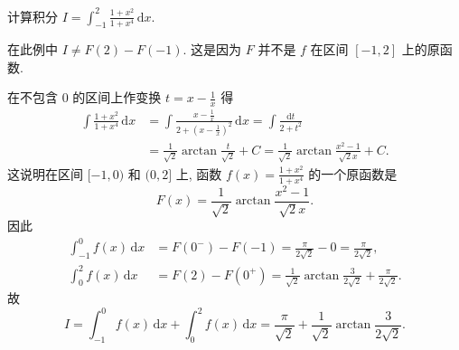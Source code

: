 \documentclass[../../main.tex]{subfiles}
\begin{document}
\begin{example}
计算积分 $I=\int_{-1}^{2}\frac{1+x^{2}}{1+x^{4}}\,\mathrm{d}x$.
\end{example}
\begin{remark}
在此例中 $I\neq F(2)-F(-1)$. 这是因为 $F$ 并不是 $f$ 在区间 $[-1,2]$ 上的原函数.
\end{remark}
\begin{solution}
在不包含 $0$ 的区间上作变换 $t=x-\frac{1}{x}$ 得
\begin{align*}
\int\frac{1+x^{2}}{1+x^{4}}\,\mathrm{d}x&=\int\frac{x-\frac{1}{x}}{2+\left(x-\frac{1}{x}\right)^{2}}\,\mathrm{d}x=\int\frac{\mathrm{d}t}{2+t^{2}}\\
&=\frac{1}{\sqrt{2}}\arctan\frac{t}{\sqrt{2}}+C=\frac{1}{\sqrt{2}}\arctan\frac{x^{2}-1}{\sqrt{2}x}+C.
\end{align*}
这说明在区间 $[-1,0)$ 和 $(0,2]$ 上, 函数 $f(x)=\frac{1+x^{2}}{1+x^{4}}$ 的一个原函数是
$$F(x)=\frac{1}{\sqrt{2}}\arctan\frac{x^{2}-1}{\sqrt{2}x}.$$
因此
\begin{align*}
\int_{-1}^{0}f(x)\,\mathrm{d}x&=F(0^{-})-F(-1)=\frac{\pi}{2\sqrt{2}}-0=\frac{\pi}{2\sqrt{2}},\\
\int_{0}^{2}f(x)\,\mathrm{d}x&=F(2)-F(0^{+})=\frac{1}{\sqrt{2}}\arctan\frac{3}{2\sqrt{2}}+\frac{\pi}{2\sqrt{2}}.
\end{align*}
故
$$I=\int_{-1}^{0}f(x)\,\mathrm{d}x+\int_{0}^{2}f(x)\,\mathrm{d}x=\frac{\pi}{\sqrt{2}}+\frac{1}{\sqrt{2}}\arctan\frac{3}{2\sqrt{2}}.$$

\end{solution}
\end{document}
